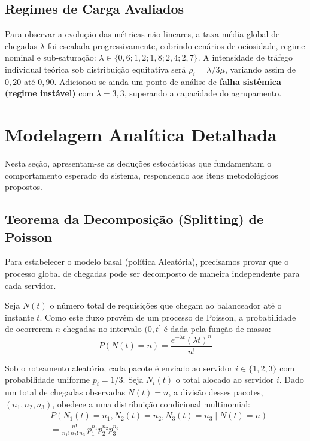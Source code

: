 \documentclass[conference]{IEEEtran}
\begin{document}
\subsection{Regimes de Carga Avaliados}

Para observar a evolução das métricas não-lineares, a taxa média global de chegadas $\lambda$ foi escalada progressivamente, cobrindo cenários de ociosidade, regime nominal e sub-saturação: $\lambda \in \{0{,}6; 1{,}2; 1{,}8; 2{,}4; 2{,}7\}$. A intensidade de tráfego individual teórica sob distribuição equitativa será $\rho_i = \lambda / 3\mu$, variando assim de $0{,}20$ até $0{,}90$. Adicionou-se ainda um ponto de análise de \textbf{falha sistêmica (regime instável)} com $\lambda = 3{,}3$, superando a capacidade do agrupamento.

\section{Modelagem Analítica Detalhada}

Nesta seção, apresentam-se as deduções estocásticas que fundamentam o comportamento esperado do sistema, respondendo aos itens metodológicos propostos.

\subsection{Teorema da Decomposição (Splitting) de Poisson}

Para estabelecer o modelo basal (política Aleatória), precisamos provar que o processo global de chegadas pode ser decomposto de maneira independente para cada servidor. 

Seja $N(t)$ o número total de requisições que chegam ao balanceador até o instante $t$. Como este fluxo provém de um processo de Poisson, a probabilidade de ocorrerem $n$ chegadas no intervalo $(0, t]$ é dada pela função de massa:
\begin{equation}
P(N(t) = n) = \frac{e^{-\lambda t}(\lambda t)^n}{n!}
\end{equation}

Sob o roteamento aleatório, cada pacote é enviado ao servidor $i \in \{1, 2, 3\}$ com probabilidade uniforme $p_i = 1/3$. Seja $N_i(t)$ o total alocado ao servidor $i$. Dado um total de chegadas observadas $N(t) = n$, a divisão desses pacotes, $(n_1, n_2, n_3)$, obedece a uma distribuição condicional multinomial:
\begin{align}
& P(N_1(t)=n_1, N_2(t)=n_2, N_3(t)=n_3 \mid N(t)=n) \nonumber \\
& = \frac{n!}{n_1! \, n_2! \, n_3!} p_1^{n_1} p_2^{n_2} p_3^{n_3}
\end{align}
\end{document}
